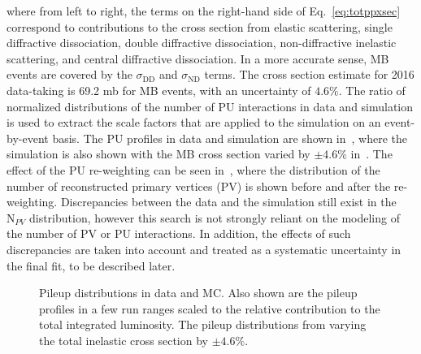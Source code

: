 where from left to right, the terms on the right-hand side of Eq.~\ref{eq:totppxsec} correspond to contributions to the cross section from elastic scattering, single diffractive dissociation, double diffractive dissociation, non-diffractive inelastic scattering, and central diffractive dissociation. In a more accurate sense, MB events are covered by the $\sigma_{\mathrm{DD}}$ and $\sigma_{\mathrm{ND}}$ terms. The cross section estimate for 2016 data-taking is 69.2 mb for MB events, with an uncertainty of $4.6\%$. The ratio of normalized distributions of the number of PU interactions in data and \ttll simulation is used to extract the scale factors that are applied to the simulation on an event-by-event basis. The PU profiles in data and simulation are shown in~, where the simulation is also shown with the MB cross section varied by $\pm4.6\%$ in~. The effect of the PU re-weighting can be seen in~, where the distribution of the number of reconstructed primary vertices (PV) is shown before and after the re-weighting. Discrepancies between the data and the simulation still exist in the $\text{N}_{PV}$ distribution, however this search is not strongly reliant on the modeling of the number of PV or PU interactions. In addition, the effects of such discrepancies are taken into account and treated as a systematic uncertainty in the final fit, to be described later. 

\begin{figure}
  \caption{\protect{} Pileup distributions in data and MC. Also shown are the pileup profiles in a few run ranges scaled to the relative contribution to the total integrated luminosity.\protect{} The pileup distributions from varying the total inelastic cross section by $\pm4.6\%$.}
  \label{fig:pu}
\end{figure}

